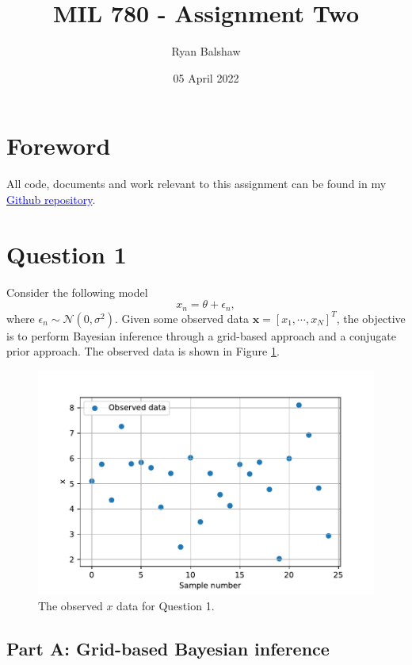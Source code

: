 \documentclass{article}
\title{MIL 780 - Assignment Two}
\author{Ryan Balshaw}
\date{05 April 2022}
\begin{document}
\maketitle

\section*{Foreword}
All code, documents and work relevant to this assignment can be found in my \href{https://github.com/RyanBalshaw/MIL_780_assignments}{\textcolor{blue}{Github repository}}.

\section{Question 1}

Consider the following model
\begin{equation}\label{eq:Q1_model}
x_n = \theta  + \epsilon_n,
\end{equation}
where $\epsilon_n \sim \mathcal{N}(0, \sigma^2)$. Given some observed data $\mathbf{x} = [x_1, \cdots, x_N]^T$, the objective is to perform Bayesian inference through a grid-based approach and a conjugate prior approach. The observed data is shown in Figure \ref{fig:Q1_data}.
\begin{figure}[htb!]
\centering
\includegraphics[scale=0.6]{Q1a_1.pdf}
\caption{The observed $x$ data for Question 1.}
\label{fig:Q1_data}
\end{figure}


\subsection{Part A: Grid-based Bayesian inference}
\end{document}

